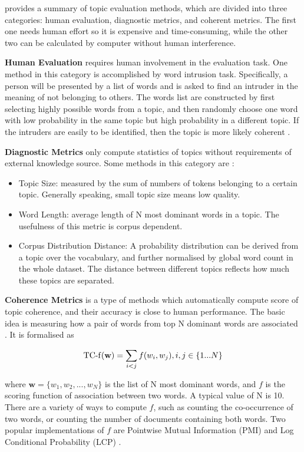 \documentclass[conference]{IEEEtran}
\providecommand{\tightlist}{%
  \setlength{\itemsep}{0pt}\setlength{\parskip}{0pt}
}
\begin{document}
\textcite{boyd-graber_care_nodate} provides a summary of topic
evaluation methods, which are divided into three categories: human
evaluation, diagnostic metrics, and coherent metrics. The first one
needs human effort so it is expensive and time-consuming, while the
other two can be calculated by computer without human interference.

\textbf{Human Evaluation} requires human involvement in the evaluation
task. One method in this category is accomplished by word intrusion
task. Specifically, a person will be presented by a list of words and is
asked to find an intruder in the meaning of not belonging to others. The
words list are constructed by first selecting highly possible words from
a topic, and then randomly choose one word with low probability in the
same topic but high probability in a different topic. If the intruders
are easily to be identified, then the topic is more likely coherent
\autocite{boyd-graber_care_nodate}.

\textbf{Diagnostic Metrics} only compute statistics of topics without
requirements of external knowledge source. Some methods in this category
are \autocite{boyd-graber_care_nodate}:

\begin{itemize}
\tightlist
\item
  Topic Size: measured by the sum of numbers of tokens belonging to a
  certain topic. Generally speaking, small topic size means low quality.
\item
  Word Length: average length of N most dominant words in a topic. The
  usefulness of this metric is corpus dependent.
\item
  Corpus Distribution Distance: A probability distribution can be
  derived from a topic over the vocabulary, and further normalised by
  global word count in the whole dataset. The distance between different
  topics reflects how much these topics are separated.
\end{itemize}

\textbf{Coherence Metrics} is a type of methods which automatically
compute score of topic coherence, and their accuracy is close to human
performance. The basic idea is measuring how a pair of words from top N
dominant words are associated \autocite{boyd-graber_care_nodate}. It is
formalised as

\[\mathrm{TC{\text-}f}(\mathbf{w}) = \sum_{i<j}{f(w_i, w_j)}, i, j \in \{1 ... N\}\]

where \(\mathbf{w} = \{w_1, w_2, ..., w_N\}\) is the list of N most
dominant words, and \(f\) is the scoring function of association between
two words. A typical value of N is 10. There are a variety of ways to
compute \(f\), such as counting the co-occurrence of two words, or
counting the number of documents containing both words. Two popular
implementations of \(f\) are Pointwise Mutual Information (PMI) and Log
Conditional Probability (LCP) \autocite{boyd-graber_care_nodate}.
\end{document}
